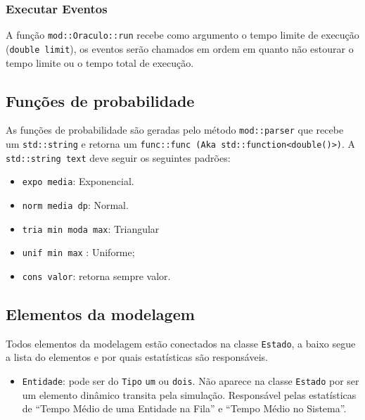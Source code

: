 \documentclass{article}
\begin{document}
\subsubsection{Executar Eventos}
A função \texttt{mod::Oraculo::run} recebe como argumento o tempo limite de execução
(\texttt{double limit}), os eventos serão chamados em ordem em quanto não estourar
o tempo limite ou o tempo total de execução.

\subsection{Funções de probabilidade}
As funções de probabilidade são geradas pelo método \texttt{mod::parser} que recebe um 
\texttt{std::string} e retorna um \texttt{func::func (Aka std::function<double()>)}. 
A \texttt{std::string text} deve seguir os seguintes padrões:
\begin{itemize}
  \item \texttt{expo media}: Exponencial.
  \item \texttt{norm media dp}: Normal.
  \item \texttt{tria min moda max}: Triangular
  \item \texttt{unif min max} : Uniforme;
  \item \texttt{cons valor}: retorna sempre valor.
\end{itemize}

\subsection{Elementos da modelagem}
Todos elementos da modelagem estão conectados na classe \texttt{Estado}, a baixo segue a lista do elementos e por quais estatísticas são responsáveis.

\begin{itemize}
  \item \texttt{Entidade}: pode ser do \texttt{Tipo} \texttt{um} ou \texttt{dois}. Não 
    aparece na classe \texttt{Estado} por ser um elemento dinâmico transita pela simulação.
    Responsável pelas estatísticas  de ``Tempo Médio de uma Entidade na Fila'' e ``Tempo 
    Médio no Sistema''.
\end{itemize}
\end{document}
